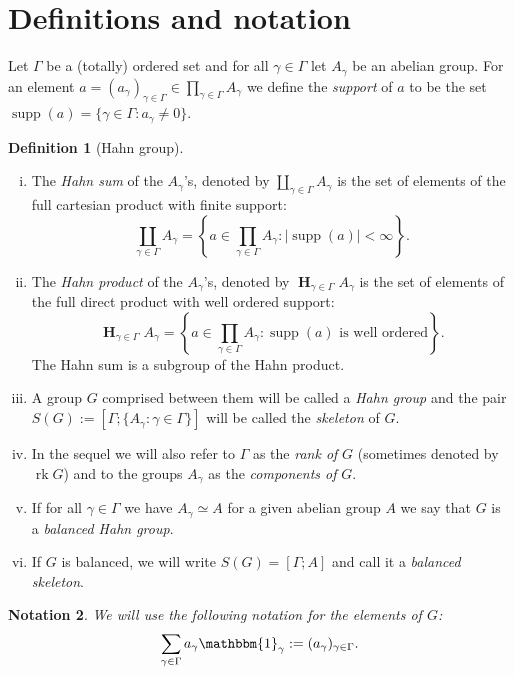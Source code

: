 \documentclass[12pt,a4paper,reqno,openright]{amsart}
\renewcommand{\1}{\mathbbm{1}}
\DeclareMathOperator{\rk}{rk}
\DeclareMathOperator*\HH{\mathbf{H}}
\DeclareMathOperator*\supp{supp}
\theoremstyle{definition}
\newtheorem{defn}{Definition}[section]
\theoremstyle{plain}
\theoremstyle{plain}
\theoremstyle{plain}
\theoremstyle{plain}
\theoremstyle{plain}
\theoremstyle{plain}
\theoremstyle{plain}
\theoremstyle{plain}
\theoremstyle{definition}
\theoremstyle{definition}
\theoremstyle{plain}
\theoremstyle{definition}
\theoremstyle{definition}
\theoremstyle{plain}
\theoremstyle{plain}
\theoremstyle{plain}
\newtheorem{notation}[defn]{Notation}
\begin{document}
\section{Definitions and notation}\label{sec:definitions-and-notation}
Let $ \Gamma $ be a (totally) ordered set and for all $ \gamma\in\Gamma $ let $ A_\gamma $ be an abelian group. For an element $ a = (a_\gamma)_{\gamma\in\Gamma} \in \prod_{\gamma\in\Gamma}A_\gamma $ we define the \emph{support} of $ a $
to be the set $ \supp(a) = \{\gamma\in\Gamma : a_\gamma\neq 0\} $.
\begin{defn}[Hahn group]
	\label{def-hahn-sum-prod}\label{der:skeleton}\label{def:rank}
	\begin{enumerate}[(i)]
	\item
	The \emph{Hahn sum} of the $ A_\gamma $'s, denoted by $ \coprod_{\gamma\in\Gamma}A_\gamma $ is the set of elements of the full cartesian product with finite support:
	\[
	\coprod_{\gamma\in\Gamma}A_\gamma = \left\lbrace a\in\prod_{\gamma\in\Gamma}A_\gamma : |\supp(a)|<\infty  \right\rbrace.
	\]
	\item 
	The \emph{Hahn product} of the $ A_\gamma $'s, denoted by $ \HH_{\gamma\in\Gamma}A_\gamma $ is the set of elements of the full direct product with well ordered support:
	\[
	\HH_{\gamma\in\Gamma}A_\gamma = \left\lbrace a\in\prod_{\gamma\in\Gamma}A_\gamma : \supp(a) \text{ is well ordered}  \right\rbrace.
	\]
	The Hahn sum is a subgroup of the Hahn product.
	\item 
	A group $ G $ comprised between them will be called a \emph{Hahn group} and the pair $ S(G):= [\Gamma;\{A_\gamma:\gamma\in\Gamma\}] $ will be called the \emph{skeleton} of $ G $.
	\item
	In the sequel we will also refer to $ \Gamma $ as the \emph{rank of} $ G $ (sometimes denoted by $ \rk G $) and to the groups $ A_\gamma $ as the \emph{components of} $ G $.
	\item 
	If for all $ \gamma\in\Gamma $ we have $ A_\gamma\simeq A $ for a given abelian group $A$ we say that $ G $ is a \emph{balanced Hahn group}.
	\item 
	If $ G $ is balanced, we will write $ S(G) = [\Gamma; A] $ and call it a \textit{balanced skeleton}.
	\end{enumerate}
\end{defn}
\begin{notation}
	We will use the following notation for the elements of $ G $:
	\[
	\sum_{\gamma\in\Gamma}a_\gamma\1_\gamma := (a_\gamma)_{\gamma\in\Gamma}.
	\]
\end{notation}
\end{document}
